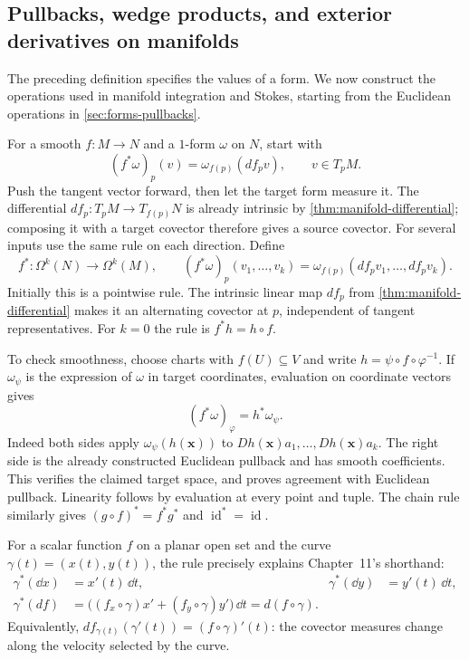 \subsection{Pullbacks, wedge products, and exterior derivatives on manifolds}
\label{sec:manifold-form-operations}
The preceding definition specifies the values of a form. We now construct
the operations used in manifold integration and Stokes, starting from the
Euclidean operations in \cref{sec:forms-pullbacks}.

For a smooth $f:M\to N$ and a $1$-form $\omega$ on $N$, start with
\[
(f^*\omega)_p(v)=\omega_{f(p)}(df_pv),\qquad v\in T_pM.
\]
Push the tangent vector forward, then let the target form measure it.
The differential $df_p:T_pM\to T_{f(p)}N$ is already intrinsic by
\cref{thm:manifold-differential}; composing it with a target covector
therefore gives a source covector. For several inputs use the same rule
on each direction. Define
\[
f^*:\Omega^k(N)\to\Omega^k(M),\qquad
(f^*\omega)_p(v_1,\ldots,v_k)
=\omega_{f(p)}(df_pv_1,\ldots,df_pv_k).
\]
Initially this is a pointwise rule. The intrinsic linear map $df_p$ from
\cref{thm:manifold-differential} makes it an alternating covector at $p$,
independent of tangent representatives. For $k=0$ the rule is $f^*h=h\circ f$.

To check smoothness, choose charts with $f(U)\subseteq V$ and write
$h=\psi\circ f\circ\varphi^{-1}$. If $\omega_\psi$ is the expression of $\omega$
in target coordinates, evaluation on coordinate vectors gives
\[
(f^*\omega)_\varphi=h^*\omega_\psi.
\]
Indeed both sides apply $\omega_\psi(h(\mathbf{x}))$ to
$Dh(\mathbf{x})a_1,\ldots,Dh(\mathbf{x})a_k$. The right side is the already constructed
Euclidean pullback and has smooth coefficients. This verifies the claimed
target space, and proves agreement with Euclidean pullback. Linearity
follows by evaluation at every point and tuple. The chain rule similarly
gives $(g\circ f)^*=f^*g^*$ and $\operatorname{id}^*=\operatorname{id}$.

For a scalar function $f$ on a planar open set and the curve
$\gamma(t)=(x(t),y(t))$, the rule precisely explains
Chapter~11's shorthand:
\[
\begin{aligned}
\gamma^*(\dd x)&=x'(t)\,\dd t,&
\gamma^*(\dd y)&=y'(t)\,\dd t,\\
\gamma^*(df)&=\bigl((f_x\circ\gamma)x'+(f_y\circ\gamma)y'\bigr)\,\dd t
             =d(f\circ\gamma).
\end{aligned}
\]
Equivalently, $df_{\gamma(t)}(\gamma'(t))=(f\circ\gamma)'(t)$:
the covector measures change along the velocity selected by the curve.

